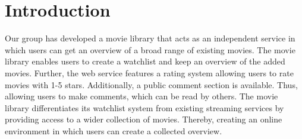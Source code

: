 \section{Introduction}

Our group has developed a movie library that acts as an independent service in which users can get an overview of a broad range of existing movies. The movie library enables users to create a watchlist and keep an overview of the added movies. Further, the web service features a rating system allowing users to rate movies with 1-5 stars. Additionally, a public comment section is available. Thus, allowing users to make comments, which can be read by others.\newline
The movie library differentiates its watchlist system from existing streaming services by providing access to a wider collection of movies. Thereby, creating an online environment in which users can create a collected overview. \newline
